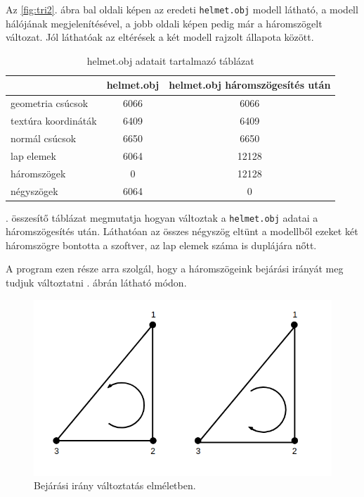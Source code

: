 Az \ref{fig:tri2}. ábra bal oldali képen az eredeti \texttt{helmet.obj} modell látható, a modell hálójának megjelenítésével, a jobb oldali képen pedig már a háromszögelt változat. Jól láthatóak az eltérések a két modell rajzolt állapota között.

\begin{table}[h]
\centering
\caption{helmet.obj adatait tartalmazó táblázat}
\bigskip
\label{tab:modellek}
\begin{tabular}{l|c|c|}
& helmet.obj & helmet.obj háromszögesítés után \\
\hline
geometria csúcsok & 6066 & 6066 \\
textúra koordináták & 6409 & 6409 \\
normál csúcsok & 6650 & 6650 \\
lap elemek & 6064 & 12128 \\
háromszögek & 0 & 12128 \\
négyszögek & 6064 & 0 \\
\hline
\end{tabular}
\label{fig:tri3}
\end{table}

. összesítő táblázat megmutatja hogyan változtak a \texttt{helmet.obj} adatai a háromszögesítés után. Láthatóan az összes négyszög eltünt a modellből ezeket két háromszögre bontotta a szoftver, az lap elemek száma is duplájára nőtt.
\newpage
{}

A program ezen része arra szolgál, hogy a háromszögeink bejárási irányát meg tudjuk változtatni . ábrán látható módon.

\begin{figure}[h]
\centering
\includegraphics[scale=0.5]{images/bejarasi.png}
\caption{Bejárási irány változtatás elméletben.}
\label{fig:bej1}
\end{figure}

